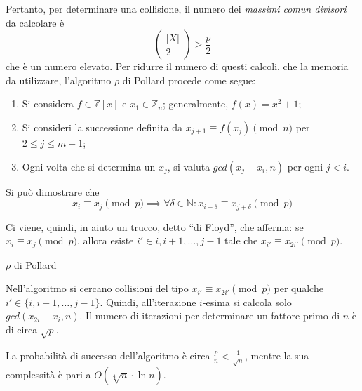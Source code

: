Pertanto, per determinare una collisione, il numero dei \emph{massimi comun divisori} da calcolare è
\begin{equation*}
	\left(
		\begin{array}{c}
			|X| \\
			2
		\end{array}
	\right) > \frac{p}{2}
\end{equation*}
che è un numero elevato. Per ridurre il numero di questi calcoli, che la memoria da utilizzare, l'algoritmo $\rho$ di Pollard procede come segue:
\begin{enumerate}
	\item Si considera $f \in \mathbb{Z}[x]$ e $x_1 \in \mathbb{Z}_n$; generalmente, $f(x) = x^2 + 1$;
	\item Si consideri la successione definita da $x_{j+1} \equiv f(x_j) \pmod{n}$ per $2 \leq j \leq m-1$;
	\item Ogni volta che si determina un $x_j$, si valuta $gcd(x_j - x_i, n)$ per ogni $j<i$.
\end{enumerate}

Si può dimostrare che \[ x_i \equiv x_j \pmod{p} \implies \forall \delta \in \mathbb{N} : x_{i+\delta} \equiv x_{j+\delta} \pmod{p} \]

Ci viene, quindi, in aiuto un trucco, detto ``di Floyd'', che afferma: se $x_i \equiv x_j \pmod{p}$, allora esiste $i' \in {i, i+1, \dotsc, j-1}$ tale che $x_{i'} \equiv x_{2i'} \pmod{p}$. 

\begin{algorithm}[H]
	\caption{$\rho$ di Pollard}
	\label{alg:pollardRHO}
	\DontPrintSemicolon
\end{algorithm}

Nell'algoritmo si cercano collisioni del tipo $x_{i'} \equiv x_{2i'} \pmod{p}$ per qualche $i' \in \{i, i+1, \dotsc, j-1\}$. Quindi, all'iterazione $i$-esima si calcola solo $gcd(x_{2i} − x_i, n)$. Il numero di iterazioni per determinare un fattore primo di $n$ è di circa $\sqrt{p}$.

La probabilità di successo dell'algoritmo è circa $\frac{p}{n} < \frac{1}{\sqrt{n}}$, mentre la sua complessità è pari a $O(\sqrt[4]{n} \cdot \ln n)$.

